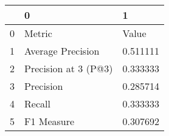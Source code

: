 \begin{tabular}{lll}
\toprule
{} &                     0 &         1 \\
\midrule
0 &                Metric &     Value \\
1 &     Average Precision &  0.511111 \\
2 &  Precision at 3 (P@3) &  0.333333 \\
3 &             Precision &  0.285714 \\
4 &                Recall &  0.333333 \\
5 &            F1 Measure &  0.307692 \\
\bottomrule
\end{tabular}
